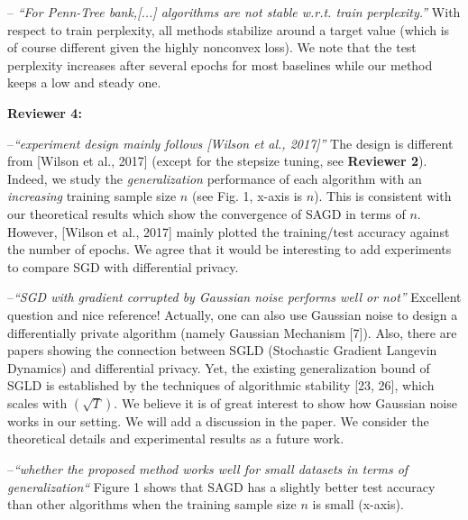 \documentclass{article}
\begin{document}
--\textit{ ``For Penn-Tree bank,[...] algorithms are not stable w.r.t. train perplexity.''}
With respect to train perplexity, all methods stabilize around a target value (which is of course different given the highly nonconvex loss). 
We note that the test perplexity increases after several epochs for most baselines while our method keeps a low and steady one.

\textbf{Reviewer 4:}
\vspace{-4pt}

--\textit{``experiment design mainly follows [Wilson et al., 2017]''}
The design is different from [Wilson et al., 2017] (except for the stepsize tuning, see \textbf{Reviewer 2}).
Indeed, we study the \emph{generalization} performance of each algorithm with an \emph{increasing} training sample size $n$ (see Fig. 1, x-axis is $n$).
This is consistent with our theoretical results which show the convergence of SAGD in terms of $n$. 
However, [Wilson et al., 2017] mainly plotted the training/test accuracy against the number of epochs. 
We agree that it would be interesting to add experiments to compare SGD with differential privacy. \vspace{-4pt}
    
--\textit{``SGD with gradient corrupted by Gaussian noise performs well or not''}
Excellent question and nice reference! 
Actually, one can also use Gaussian noise to design a differentially private algorithm (namely Gaussian Mechanism [7]). 
Also, 
there are papers showing the connection between SGLD (Stochastic Gradient Langevin Dynamics) and differential privacy. 
Yet, the existing generalization bound of SGLD is established by the techniques of algorithmic stability [23, 26], which scales with $(\sqrt{T})$. 
We believe it is of great interest to show how Gaussian noise works in our setting. 
We will add a discussion in the paper. 
We consider the theoretical details and experimental results as a future work.\vspace{-4pt}

    
--\textit{``whether the proposed method works well for small datasets in terms of generalization``}
Figure 1 shows that SAGD has a slightly better test accuracy than other algorithms when the training sample size $n$ is small (x-axis). 
    
\end{document}
